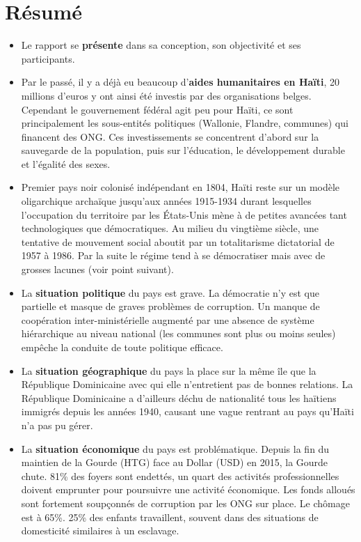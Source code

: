 \documentclass[a4paper, 11pt]{article}
\begin{document}
\section*{Résumé}
\begin{itemize}
  \item Le rapport se \textbf{présente} dans sa conception, son objectivité et ses participants.
  \item Par le passé, il y a déjà eu beaucoup d'\textbf{aides humanitaires en Haïti}, 20 millions d'euros y ont ainsi été investis par des organisations belges. Cependant le gouvernement fédéral agit peu pour Haïti, ce sont principalement les sous-entités politiques (Wallonie, Flandre, communes) qui financent des ONG. Ces investissements se concentrent d'abord sur la sauvegarde de la population, puis sur l'éducation, le développement durable et l'égalité des sexes.
  \item Premier pays noir colonisé indépendant en 1804, Haïti reste sur un modèle oligarchique archaïque jusqu'aux années 1915-1934 durant lesquelles l'occupation du territoire par les \'Etats-Unis mène à de petites avancées tant technologiques que démocratiques. Au milieu du vingtième siècle, une tentative de mouvement social aboutit par un totalitarisme dictatorial de 1957 à 1986. Par la suite le régime tend à se démocratiser mais avec de grosses lacunes (voir point suivant).
  \item La \textbf{situation politique} du pays est grave. La démocratie n'y est que partielle et masque de graves problèmes de corruption. Un manque de coopération inter-ministérielle augmenté par une absence de système hiérarchique au niveau national (les communes sont plus ou moins seules) empêche la conduite de toute politique efficace.
  \item La \textbf{situation géographique} du pays la place sur la même île que la République Dominicaine avec qui elle n'entretient pas de bonnes relations. La République Dominicaine a d'ailleurs déchu de nationalité tous les haïtiens immigrés depuis les années 1940, causant une vague rentrant au pays qu'Haïti n'a pas pu gérer.
  \item La \textbf{situation économique} du pays est problématique. Depuis la fin du maintien de la Gourde (HTG) face au Dollar (USD) en 2015, la Gourde chute. 81\% des foyers sont endettés, un quart des activités professionnelles doivent emprunter pour poursuivre une activité économique. Les fonds alloués sont fortement soupçonnés de corruption par les ONG sur place. Le chômage est à 65\%. 25\% des enfants travaillent, souvent dans des situations de domesticité similaires à un esclavage.

\end{itemize}
\end{document}
